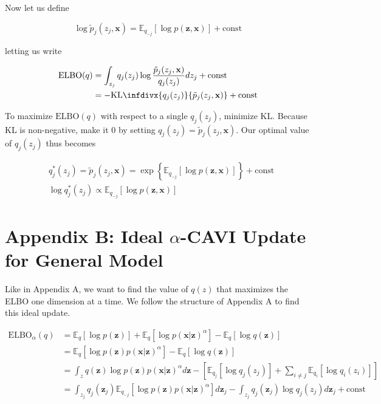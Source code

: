 \documentclass[letterpaper,12pt]{article}
\newcommand{\lc}{\left \{} %
\newcommand{\rc}{\right \}} %
\newcommand{\lb}{\left [} %
\newcommand{\rb}{\right ]} %
\newcommand{\pz}{\ensuremath{p(\boldsymbol{z})}}
\newcommand{\pzx}{\ensuremath{p(\boldsymbol{z}, \boldsymbol{x})}}
\newcommand{\pxgivenz}{\ensuremath{p(\boldsymbol{x} | \boldsymbol{z})}}
\newcommand{\qz}{\ensuremath{q(\boldsymbol{z})}}
\newcommand{\x}{\mathbf{x}}
\newcommand{\z}{\mathbf{z}}
\newcommand{\kld}[2]{\ensuremath{\mathrm{KL}\infdivx{#1}{#2}}\xspace}
\newcommand{\elboq}{\ensuremath{\mathrm{ELBO}(q)}}
\newcommand{\elbo}{\ensuremath{\mathrm{ELBO}}}
\newcommand{\E}{\mathbb{E}_q}
\newcommand{\el}{\left[} %
\newcommand{\er}{\right]} %
\begin{document}
Now let us define

\begin{equation}
    \log \tilde{p}_j(z_j, \x) =  \mathbb{E}_{q_{-j}} \el \log \pzx \er + \textrm{const}
\end{equation}

letting us write

\begin{equation}
\begin{split}
     \elboq &= \int_{z_j} q_j(z_j) \log \frac{\tilde{p}_j(z_j, \x)}{q_j(z_j)} dz_j + \textrm{const} \\
     &= - \kld{q_j(z_j)}{\tilde{p}_j(z_j, \x)} + \textrm{const}
\end{split}
\end{equation}

To maximize $\elboq$ with respect to a single $q_j(z_j)$, minimize KL. Because KL is non-negative, make it $0$ by setting $q_j(z_j) = \tilde{p}_j(z_j, \x)$. Our optimal value of $q_j(z_j)$ thus becomes

\begin{equation}
\begin{split}
    &q_j^*(z_j) = \tilde{p}_j(z_j, \x) = \exp \lc \mathbb{E}_{q_{-j}} \el \log \pzx \er \rc + \textrm{const}\\
    &\log q_j^*(z_j) \propto \mathbb{E}_{q_{-j}} \el \log \pzx \er
\end{split}
\end{equation}

\section{Appendix B: Ideal $\alpha$-CAVI Update for General Model}

Like in Appendix A, we want to find the value of $q(z)$ that maximizes the ELBO one dimension at a time. We follow the structure of Appendix A to find this ideal update.

\begin{equation}
\begin{split}
    \elbo_\alpha(q) &= \E \el \log \pz \er +  \E \el \log \pxgivenz^\alpha \er  - \E \el \log \qz \er\\
    &= \E \el \log \pz \pxgivenz^\alpha \er - \E \el \log \qz \er\\
    &= \int_z q(\z) \log \pz \pxgivenz^\alpha  d\z - \lb \mathbb{E}_{q_j} \el \log q_j(z_j) \er + \sum_{i \neq j} \mathbb{E}_{q_i} \el \log q_i(z_i) \er \rb \\ 
    &= \int_{z_j} q_j(\z_j) \mathbb{E}_{q_{-j}} \el \log \pz \pxgivenz^\alpha \er d\z_j -  \int_{z_j} q_j(\z_j) \log q_j(z_j) d\z_j + \textrm{const} \\ 
\end{split}
\end{equation}
\end{document}
